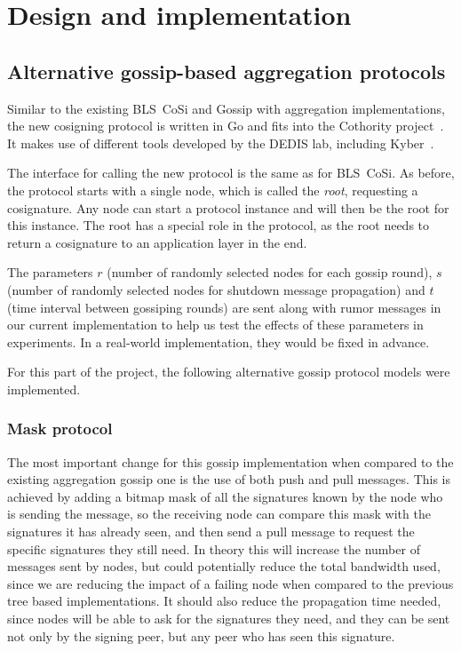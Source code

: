 \section{Design and implementation}

\subsection{Alternative gossip-based aggregation protocols}

Similar to the existing BLS~CoSi and Gossip with aggregation implementations, the new cosigning protocol is written in Go and fits into the Cothority project~\cite{Coth}.
It makes use of different tools developed by the DEDIS lab, including Kyber~\cite{Kyber}.

The interface for calling the new protocol is the same as for BLS~CoSi.
As before, the protocol starts with a single node, which is called the \emph{root}, requesting a cosignature.
Any node can start a protocol instance and will then be the root for this instance.
The root has a special role in the protocol, as the root needs to return a cosignature to an application layer in the end.


The parameters $r$ (number of randomly selected nodes for each gossip round), $s$ (number of randomly selected nodes for shutdown message propagation) and $t$ (time interval between gossiping rounds) are sent along with rumor messages in our current implementation to help us test the effects of these parameters in experiments.
In a real-world implementation, they would be fixed in advance.

For this part of the project, the following alternative gossip protocol models were implemented.

\subsubsection{Mask protocol}

The most important change for this gossip implementation when compared to the existing aggregation gossip one is the use of both push and pull messages. This is achieved by adding a bitmap mask of all the signatures known by the node who is sending the message, so the receiving node can compare this mask with the signatures it has already seen, and then send a pull message to request the specific signatures they still need. In theory this will increase the number of messages sent by nodes, but could potentially reduce the total bandwidth used, since we are reducing the impact of a failing node when compared to the previous tree based implementations. It should also reduce the propagation time needed, since nodes will be able to ask for the signatures they need, and they can be sent not only by the signing peer, but any peer who has seen this signature.

